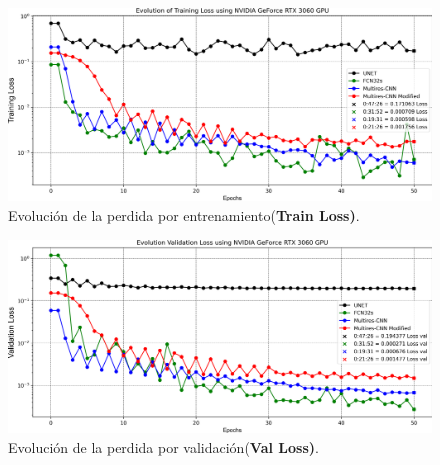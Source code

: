 \documentclass[10pt,letterpaper]{article}
\begin{document}
\begin{figure}[H]
	\centering
    \includegraphics[width=1\textwidth]{tifs/tif152.png}
    \caption{Evolución de la perdida por entrenamiento(\textbf{Train Loss)}.}
    \label{tif152}
\end{figure}

\begin{figure}[H]
	\centering
    \includegraphics[width=1\textwidth]{tifs/tif153.png}
    \caption{Evolución de la perdida por validación(\textbf{Val Loss)}.}
    \label{tif153}
\end{figure}
\end{document}
